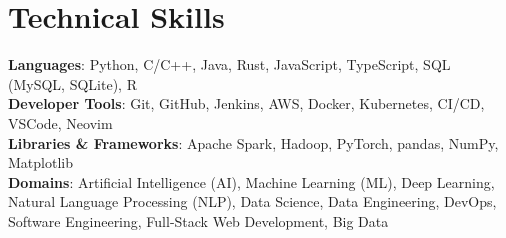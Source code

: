 \documentclass[letterpaper,11pt]{article}
\makeatletter
\newcommand{\resumeItem}[1]{
  \item\small{
    {#1 \vspace{-2pt}}
  }
}
\newcommand{\resumeSubheading}[4]{
  \vspace{-2pt}\item
    \begin{tabular*}{0.97\textwidth}[t]{l@{\extracolsep{\fill}}r}
      \textbf{#1} & #2 \\
      \small{#3} & \small{#4} \\
    \end{tabular*}\vspace{-7pt}
}
\newcommand{\resumeSubSubheading}[2]{
    \item
    \begin{tabular*}{0.97\textwidth}{l@{\extracolsep{\fill}}r}
      \textit{\small#1} & \small #2 \\
    \end{tabular*}\vspace{-7pt}
}
\newcommand{\resumeSubHeadingListStart}{\begin{itemize}[leftmargin=0.15in, label={}]}
\newcommand{\resumeSubHeadingListEnd}{\end{itemize}}
\newcommand{\resumeItemListStart}{\begin{itemize}}
\newcommand{\resumeItemListEnd}{\end{itemize}\vspace{-5pt}}
\makeatother
\begin{document}
%
\section{Technical Skills}
 \begin{itemize}[leftmargin=0.15in, label={}]
    \small{\item{
     \textbf{Languages}{: Python, C/C++, Java, Rust, JavaScript, TypeScript, SQL (MySQL, SQLite), R} \\
     \textbf{Developer Tools}{: Git, GitHub, Jenkins, AWS, Docker, Kubernetes, CI/CD, VSCode, Neovim} \\
     \textbf{Libraries \& Frameworks}{: Apache Spark, Hadoop, PyTorch, pandas, NumPy, Matplotlib} \\
     \textbf{Domains}{: Artificial Intelligence (AI), Machine Learning (ML), Deep Learning, Natural Language Processing (NLP), Data Science, Data Engineering, DevOps, Software Engineering, Full-Stack Web Development, Big Data}
    }}
 \end{itemize}


        

\end{document}
